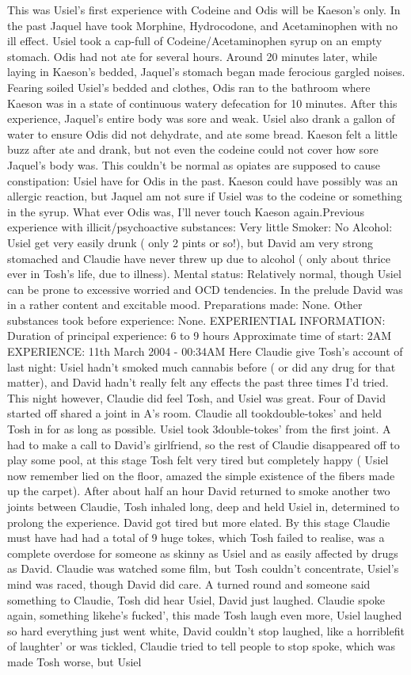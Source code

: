 \documentclass[12pt]{book}
\begin{document}
This was Usiel's first experience with Codeine and Odis will be Kaeson's only. In the past Jaquel have took Morphine, Hydrocodone, and Acetaminophen with no ill effect. Usiel took a cap-full of Codeine/Acetaminophen syrup on an empty stomach. Odis had not ate for several hours. Around 20 minutes later, while laying in Kaeson's bedded, Jaquel's stomach began made ferocious gargled noises. Fearing soiled Usiel's bedded and clothes, Odis ran to the bathroom where Kaeson was in a state of continuous watery defecation for 10 minutes. After this experience, Jaquel's entire body was sore and weak. Usiel also drank a gallon of water to ensure Odis did not dehydrate, and ate some bread. Kaeson felt a little buzz after ate and drank, but not even the codeine could not cover how sore Jaquel's body was. This couldn't be normal as opiates are supposed to cause constipation: Usiel have for Odis in the past. Kaeson could have possibly was an allergic reaction, but Jaquel am not sure if Usiel was to the codeine or something in the syrup. What ever Odis was, I'll never touch Kaeson again.Previous experience with illicit/psychoactive substances: Very little Smoker: No Alcohol: Usiel get very easily drunk ( only 2 pints or so!), but David am very strong stomached and Claudie have never threw up due to alcohol ( only about thrice ever in Tosh's life, due to illness). Mental status: Relatively normal, though Usiel can be prone to excessive worried and OCD tendencies. In the prelude David was in a rather content and excitable mood. Preparations made: None. Other substances took before experience: None. EXPERIENTIAL INFORMATION: Duration of principal experience: 6 to 9 hours Approximate time of start: 2AM EXPERIENCE: 11th March 2004 - 00:34AM Here Claudie give Tosh's account of last night: Usiel hadn't smoked much cannabis before ( or did any drug for that matter), and David hadn't really felt any effects the past three times I'd tried. This night however, Claudie did feel Tosh, and Usiel was great. Four of David started off shared a joint in A's room. Claudie all tookdouble-tokes' and held Tosh in for as long as possible. Usiel took 3double-tokes' from the first joint. A had to make a call to David's girlfriend, so the rest of Claudie disappeared off to play some pool, at this stage Tosh felt very tired but completely happy ( Usiel now remember lied on the floor, amazed the simple existence of the fibers made up the carpet). After about half an hour David returned to smoke another two joints between Claudie, Tosh inhaled long, deep and held Usiel in, determined to prolong the experience. David got tired but more elated. By this stage Claudie must have had had a total of 9 huge tokes, which Tosh failed to realise, was a complete overdose for someone as skinny as Usiel and as easily affected by drugs as David. Claudie was watched some film, but Tosh couldn't concentrate, Usiel's mind was raced, though David did care. A turned round and someone said something to Claudie, Tosh did hear Usiel, David just laughed. Claudie spoke again, something likehe's fucked', this made Tosh laugh even more, Usiel laughed so hard everything just went white, David couldn't stop laughed, like a horriblefit of laughter' or was tickled, Claudie tried to tell people to stop spoke, which was made Tosh worse, but Usiel 
\end{document}
